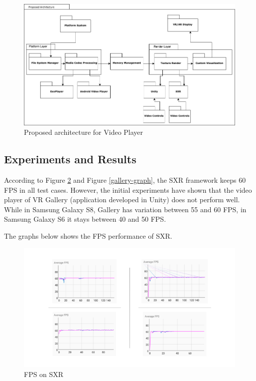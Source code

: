 \documentclass[12pt]{article}
\begin{document}

\begin{figure}[h!]
    \centerline{\includegraphics[scale=0.5]{images/ProposedArch.png}}
    \caption{Proposed architecture for Video Player}
    \label{fig-video-player-arch}
\end{figure}

\subsection{Experiments and Results}

According to Figure \ref{SXR-graph} and Figure \ref{gallery-graph}, the SXR framework keeps 60 FPS in all test cases. However, the initial experiments have shown that the video player of VR Gallery (application developed in Unity) does not perform well. While in Samsung Galaxy S8, Gallery has variation between 55 and 60 FPS, in Samsung Galaxy S6 it stays between 40 and 50 FPS.

The graphs below shows the FPS performance of SXR.

\begin{figure}[!h]
    \centerline{\includegraphics[scale=0.45]{images/SXR.png}}
    \caption{FPS on SXR}
    \label{SXR-graph}
\end{figure}
\end{document}
